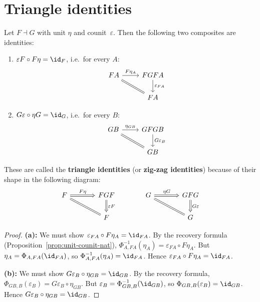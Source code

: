 \section{Triangle identities}\label{sec:triangle-identities}

\begin{theorem}\label{thm:triangle-identities}
Let $F\dashv G$ with unit $\eta$ and counit~$\varepsilon$.
Then the following two composites are identities:
\begin{enumerate}[label=(\alph*)]
\item $\varepsilon F \circ F\eta = \id_F$, i.e.\ for every $A$:
\[
\begin{tikzcd}
FA \arrow[r, "F\eta_A"] \arrow[dr, equal] & FGFA \arrow[d, "\varepsilon_{FA}"] \\
& FA
\end{tikzcd}
\]
\item $G\varepsilon \circ \eta G = \id_G$, i.e.\ for every $B$:
\[
\begin{tikzcd}
GB \arrow[r, "\eta_{GB}"] \arrow[dr, equal] & GFGB \arrow[d, "G\varepsilon_B"] \\
& GB
\end{tikzcd}
\]
\end{enumerate}
These are called the \textbf{triangle identities} (or \textbf{zig-zag
identities}) because of their shape in the following diagram:
\[
\begin{tikzcd}[column sep=large]
F \arrow[r, Rightarrow, "F\eta"] \arrow[dr, equal]
  & FGF \arrow[d, Rightarrow, "\varepsilon F"] &
G \arrow[r, Rightarrow, "\eta G"] \arrow[dr, equal]
  & GFG \arrow[d, Rightarrow, "G\varepsilon"] \\
& F & & G
\end{tikzcd}
\]
\end{theorem}

\begin{proof}
\textbf{(a):}
We must show $\varepsilon_{FA}\circ F\eta_A = \id_{FA}$.
By the recovery formula (Proposition~\ref{prop:unit-counit-nat}),
$\Phi^{-1}_{A,FA}(\eta_A) = \varepsilon_{FA}\circ F\eta_A$.
But $\eta_A = \Phi_{A,FA}(\id_{FA})$, so
$\Phi^{-1}_{A,FA}(\eta_A) = \id_{FA}$.
Hence $\varepsilon_{FA}\circ F\eta_A = \id_{FA}$.

\medskip
\textbf{(b):}
We must show $G\varepsilon_B\circ\eta_{GB} = \id_{GB}$.
By the recovery formula,
$\Phi_{GB,B}(\varepsilon_B) = G\varepsilon_B\circ\eta_{GB}$.
But $\varepsilon_B = \Phi^{-1}_{GB,B}(\id_{GB})$, so
$\Phi_{GB,B}(\varepsilon_B) = \id_{GB}$.
Hence $G\varepsilon_B\circ\eta_{GB} = \id_{GB}$.
\end{proof}


